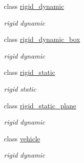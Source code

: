 \begin{DoxyCompactItemize}
class \hyperlink{classnebula_1_1content_1_1actor_1_1renderer_1_1rigid__dynamic}{rigid\_\-dynamic}
\begin{DoxyCompactList}\small\item\em rigid dynamic \item\end{DoxyCompactList}\item 
class \hyperlink{classnebula_1_1content_1_1actor_1_1renderer_1_1rigid__dynamic__box}{rigid\_\-dynamic\_\-box}
\begin{DoxyCompactList}\small\item\em rigid dynamic \item\end{DoxyCompactList}\item 
class \hyperlink{classnebula_1_1content_1_1actor_1_1renderer_1_1rigid__static}{rigid\_\-static}
\begin{DoxyCompactList}\small\item\em rigid static \item\end{DoxyCompactList}\item 
class \hyperlink{classnebula_1_1content_1_1actor_1_1renderer_1_1rigid__static__plane}{rigid\_\-static\_\-plane}
\begin{DoxyCompactList}\small\item\em rigid dynamic \item\end{DoxyCompactList}\item 
class \hyperlink{classnebula_1_1content_1_1actor_1_1renderer_1_1vehicle}{vehicle}
\begin{DoxyCompactList}\small\item\em rigid dynamic \item\end{DoxyCompactList}\end{DoxyCompactItemize}
